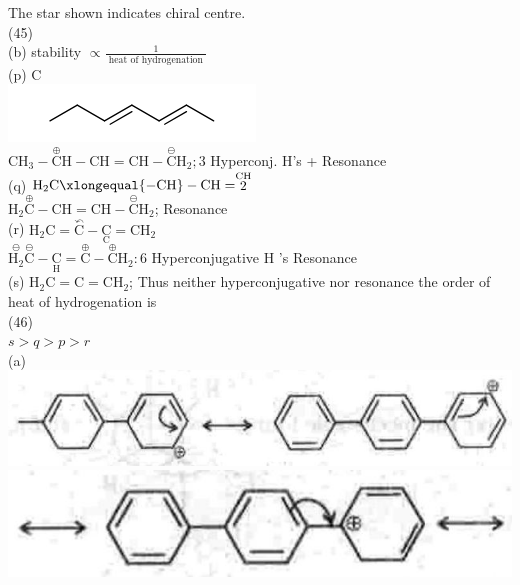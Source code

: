 \documentclass[10pt]{article}
\begin{document}
The star shown indicates chiral centre.\\
(45)\\
(b) stability $\propto \frac{1}{\text { heat of hydrogenation }}$\\
(p) C\\
\includegraphics{smile-97c0c389db3d713225c11a65232a2c47bcbc701c}\\
$\mathrm{CH}_{3}-\stackrel{\oplus}{\mathrm{C}} \mathrm{H}-\mathrm{CH}=\mathrm{CH}-\stackrel{\ominus}{\mathrm{C}} \mathrm{H}_{2} ; 3$ Hyperconj. H's + Resonance\\
(q) $\mathrm{H}_{2} \mathrm{C} \xlongequal{-\mathrm{CH}}-\mathrm{CH}=\stackrel{\mathrm{CH}}{2}$ $\qquad$\\
$\mathrm{H}_{2} \stackrel{\oplus}{\mathrm{C}}-\mathrm{CH}=\mathrm{CH}-\stackrel{\ominus}{\mathrm{C}} \mathrm{H}_{2}$; Resonance\\
(r) $\mathrm{H}_{2} \mathrm{C}=\stackrel{\curvearrowleft}{\mathrm{C}}-\underset{\mathrm{C}}{\mathrm{C}}=\mathrm{CH}_{2}$\\
$\stackrel{\ominus}{\mathrm{H}_{2}} \stackrel{\ominus}{\mathrm{C}}-\underset{\mathrm{H}}{\mathrm{C}}=\stackrel{\oplus}{\mathrm{C}}-\stackrel{\oplus}{\mathrm{C}} \mathrm{H}_{2}: 6$ Hyperconjugative H 's Resonance\\
(s) $\mathrm{H}_{2} \mathrm{C}=\mathrm{C}=\mathrm{CH}_{2}$; Thus neither hyperconjugative nor resonance the order of heat of hydrogenation is\\
(46)\\
$s>q>p>r$\\
(a)\\
\includegraphics[max width=\textwidth, center]{2025_01_28_8470952b98110cec3aabg-166(5)}\\
\includegraphics[max width=\textwidth, center]{2025_01_28_8470952b98110cec3aabg-166(6)}\\
\end{document}
